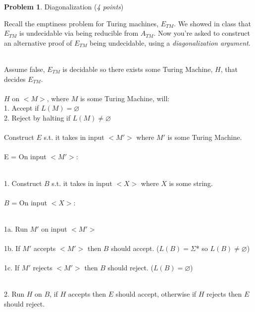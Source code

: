 \documentclass[11pt]{article}
\theoremstyle{definition}
\theoremstyle{theorem}
\newtheorem{prob}{Problem}
\newcommand{\solution}{\medskip\noindent{\color{blue}\textbf{Solution:}}}
\begin{document}
\newpage


\begin{prob} Diagonalization (\emph{4 points}) \end{prob}

Recall the emptiness problem for Turing machines, $E_{TM}$. We showed in class that  $E_{TM}$ is undecidable via being reducible from $A_{TM}$. Now you're asked to construct an alternative proof of $E_{TM}$ being undecidable, using a \emph{diagonalization argument}. 

\solution\\
Assume false, $E_{TM}$ is decidable so there exists some Turing Machine, $H$, that decides $E_{TM}$. \\~\\
$H$ on $<M>$, where $M$ is some Turing Machine, will: \\
1. Accept if $L(M) = \varnothing$ \\
2. Reject by halting if $L(M) \neq \varnothing$ \\~\\
Construct $E$ s.t. it takes in input $<M'>$ where $M'$ is some Turing Machine. \\~\\
E = On input $<M'>$:\\~\\
\hspace*{0.5cm}
\begin{minipage}{1.8\textwidth}
	1. Construct $B$ s.t. it takes in input $<X>$ where $X$ is some string.\\~\\ 
	$B$ = On input $<X>$: \\~\\
	\hspace*{0.9cm}
	\begin{minipage}{1.8\textwidth}
		1a. Run $M'$ on input $<M'>$\\~\\
		1b. If $M'$ accepts $<M'>$ then $B$ should accept. ($L(B) = \Sigma$* so $L(B) \neq \varnothing$)\\~\\
		1c. If $M'$ rejects $<M'>$ then $B$ should reject. ($L(B) = \varnothing$) \\~\\
	\end{minipage}
	2. Run $H$ on $B$, if $H$ accepts then $E$ should accept, otherwise if $H$ rejects then $E$ should reject. \\~\\
\end{minipage}
\end{document}
